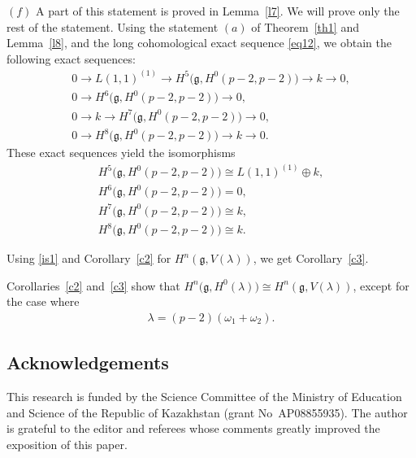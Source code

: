 \documentclass[pdftex]{sigma}%
\numberwithin{equation}{section}
\begin{document}
$(f)$ A part of this statement is proved in Lemma~\ref{l7}. We will prove only the rest of the statement. Using the statement $(a)$ of Theorem~\ref{th1} and Lemma~\ref{l8}, and the long cohomological exact sequence \eqref{eq12}, we obtain the following exact sequences:
\begin{gather*}
0\longrightarrow L(1,1)^{(1)}\longrightarrow H^5\big(\mathfrak{g},H^0(p-2,p-2)\big)\longrightarrow k \longrightarrow 0,
\\
0\longrightarrow H^6\big(\mathfrak{g},H^0(p-2,p-2)\big)\longrightarrow 0,
\\
0\longrightarrow k\longrightarrow H^7\big(\mathfrak{g},H^0(p-2,p-2)\big)\longrightarrow 0,
\\
0\longrightarrow H^8\big(\mathfrak{g},H^0(p-2,p-2)\big)\longrightarrow k \longrightarrow 0.
\end{gather*}
These exact sequences yield the isomorphisms
\begin{gather*}
H^5\big(\mathfrak{g},H^0(p-2,p-2)\big)\cong L(1,1)^{(1)}\oplus k,
\\
H^6\big(\mathfrak{g},H^0(p-2,p-2)\big)=0,
\\
H^7\big(\mathfrak{g},H^0(p-2,p-2)\big)\cong k,
\\
H^8\big(\mathfrak{g},H^0(p-2,p-2)\big)\cong k.
\end{gather*}

Using \eqref{is1} and Corollary~\ref{c2} for $H^n(\mathfrak{g},V(\lambda))$, we get Corollary~\ref{c3}.

Corollaries~\ref{c2} and~\ref{c3} show that $H^n\big(\mathfrak{g},H^0(\lambda)\big)\cong H^n(\mathfrak{g},V(\lambda))$, except for the case where \begin{gather*}
 \lambda=(p-2)(\omega_1+\omega_2).
 \end{gather*}

\subsection*{Acknowledgements}

This research is funded by the Science Committee of the Ministry of Education and Science of the Republic of Kazakhstan (grant No~AP08855935).
The author is grateful to the editor and referees whose comments greatly improved the exposition of this paper.
\end{document}

